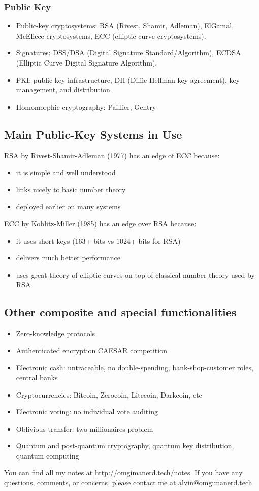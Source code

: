 \documentclass{math}
\begin{document}
\subsubsection*{Public Key}
\begin{itemize}
  \item Public-key cryptosystems: RSA (Rivest, Shamir, Adleman), ElGamal,
  McEliece cryptosystems, ECC (elliptic curve cryptosystems).
  \item Signatures: DSS/DSA (Digital Signature Standard/Algorithm), ECDSA
  (Elliptic Curve Digital Signature Algorithm).
  \item PKI: public key infrastructure, DH (Diffie Hellman key agreement),
  key management, and distribution.
  \item Homomorphic cryptography: Paillier, Gentry
\end{itemize}

\subsection*{Main Public-Key Systems in Use}
RSA by Rivest-Shamir-Adleman (1977) has an edge of ECC because:
\begin{itemize}
  \item it is simple and well understood
  \item links nicely to basic number theory
  \item deployed earlier on many systems
\end{itemize}
ECC by Koblitz-Miller (1985) has an edge over RSA because:
\begin{itemize}
  \item it uses short keys (163+ bits vs 1024+ bits for RSA)
  \item delivers much better performance
  \item uses great theory of elliptic curves on top of classical number theory
  used by RSA
\end{itemize}

\subsection*{Other composite and special functionalities}
\begin{itemize}
  \item Zero-knowledge protocols
  \item Authenticated encryption CAESAR competition
  \item Electronic cash: untraceable, no double-spending, bank-shop-customer
  roles, central banks
  \item Cryptocurrencies: Bitcoin, Zerocoin, Litecoin, Darkcoin, etc
  \item Electronic voting: no individual vote auditing
  \item Oblivious transfer: two millionaires problem
  \item Quantum and post-quantum cryptography, quantum key distribution,
  quantum computing
\end{itemize}

\begin{center}
  You can find all my notes at \url{http://omgimanerd.tech/notes}. If you have
  any questions, comments, or concerns, please contact me at
  alvin@omgimanerd.tech
\end{center}
\end{document}

